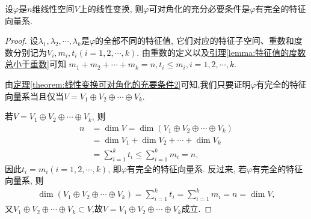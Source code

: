 \documentclass[../../main.tex]{subfiles}%
\begin{document}
\begin{theorem}[线性变换可对角化的充要条件]\label{theorem:线性变换可对角化的充要条件3}
设$\varphi$是$n$维线性空间$V$上的线性变换, 则$\varphi$可对角化的充分必要条件是$\varphi$有完全的特征向量系.
\end{theorem}
\begin{proof}
设$\lambda_1, \lambda_2, \cdots, \lambda_k$是$\varphi$的全部不同的特征值, 它们对应的特征子空间、重数和度数分别记为$V_i, m_i, t_i (i = 1, 2, \cdots, k)$. 由重数的定义以及\hyperref[lemma:特征值的度数总小于重数]{引理\ref{lemma:特征值的度数总小于重数}}可知
$m_1 + m_2 + \cdots + m_k = n, t_i \leqslant  m_i, i = 1, 2, \cdots, k$.

由\hyperref[theorem:线性变换可对角化的充要条件2]{定理\ref{theorem:线性变换可对角化的充要条件2}}可知,我们只要证明$\varphi$有完全的特征向量系当且仅当$V = V_1 \oplus V_2 \oplus \cdots \oplus V_k$.

若$V = V_1 \oplus V_2 \oplus \cdots \oplus V_k$, 则
\begin{align*}
n &= \dim V = \dim(V_1 \oplus V_2 \oplus \cdots \oplus V_k) \\
&= \dim V_1 + \dim V_2 + \cdots + \dim V_k \\
&= \sum_{i=1}^{k} t_i \leqslant  \sum_{i=1}^{k} m_i = n,
\end{align*}
因此$t_i = m_i (i = 1, 2, \cdots, k)$, 即$\varphi$有完全的特征向量系. 反过来, 若$\varphi$有完全的特征向量系, 则
\begin{align*}
\dim(V_1 \oplus V_2 \oplus \cdots \oplus V_k) = \sum_{i=1}^{k} t_i = \sum_{i=1}^{k} m_i = n = \dim V,
\end{align*}
又$V_1\oplus V_2\oplus \cdots \oplus V_k\subset V$,故$V = V_1 \oplus V_2 \oplus \cdots \oplus V_k$成立.
\end{proof}
\end{document}
